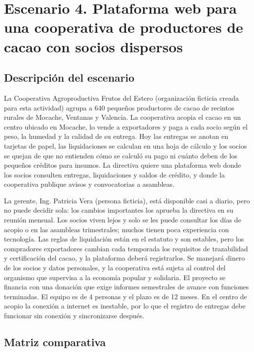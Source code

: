 \documentclass[12pt,a4paper]{article}
\begin{document}

\section{Escenario 4. Plataforma web para una cooperativa de productores de cacao con socios dispersos}

\subsection{Descripción del escenario}

La Cooperativa Agroproductiva Frutos del Estero (organización ficticia creada para esta actividad) agrupa
a 640 pequeños productores de cacao de recintos rurales de Mocache, Ventanas y Valencia. La cooperativa acopia el cacao en un centro ubicado en Mocache, lo vende a exportadores y paga a cada
socio según el peso, la humedad y la calidad de su entrega. Hoy las entregas se anotan en tarjetas de
papel, las liquidaciones se calculan en una hoja de cálculo y los socios se quejan de que no entienden
cómo se calculó su pago ni cuánto deben de los pequeños créditos para insumos. La directiva quiere
una plataforma web donde los socios consulten entregas, liquidaciones y saldos de crédito, y donde la
cooperativa publique avisos y convocatorias a asambleas.

La gerente, Ing. Patricia Vera (persona ficticia), está disponible casi a diario, pero no puede decidir sola:
los cambios importantes los aprueba la directiva en su reunión mensual. Los socios viven lejos y solo se
les puede consultar los días de acopio o en las asambleas trimestrales; muchos tienen poca experiencia
con tecnología. Las reglas de liquidación están en el estatuto y son estables, pero los compradores exportadores cambian cada temporada los requisitos de trazabilidad y certificación del cacao, y la plataforma
deberá registrarlos. Se manejará dinero de los socios y datos personales, y la cooperativa está sujeta
al control del organismo que supervisa a la economía popular y solidaria. El proyecto se financia con
una donación que exige informes semestrales de avance con funciones terminadas. El equipo es de 4
personas y el plazo es de 12 meses. En el centro de acopio la conexión a internet es inestable, por lo que
el registro de entregas debe funcionar sin conexión y sincronizarse después.

\FloatBarrier
\subsection{Matriz comparativa}
\end{document}
